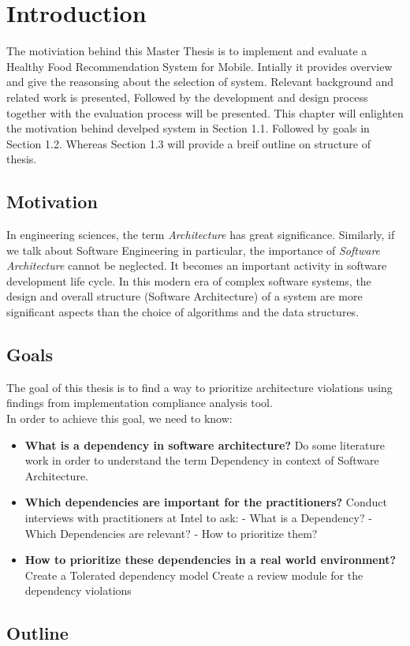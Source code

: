 \chapter{Introduction}
\setcounter{page}{1}%
\thispagestyle{empty}

The motiviation behind this Master Thesis is to implement and evaluate a Healthy Food Recommendation System for Mobile. Intially it provides overview and give the reasonsing about the selection of system. Relevant background and related work is presented, Followed by the development and design process together with the evaluation process will be presented. \newline
This chapter will enlighten the motivation behind develped system in Section 1.1. Followed by goals in Section 1.2. Whereas Section 1.3 will provide a breif outline on structure of thesis.

\section{Motivation}\label{motivation}
In engineering sciences, the term \textit{Architecture} has great significance. Similarly, if we talk about Software Engineering in particular, the importance of \textit{Software Architecture} cannot be neglected. It becomes an important activity in software development life cycle. In this modern era of complex software systems, the design and overall structure (Software Architecture) of a system are more significant aspects than the choice of algorithms and the data structures.\newline

\section{Goals}
The goal of this thesis is to find a way to prioritize architecture violations using findings from implementation compliance analysis tool. \\In order to achieve this goal, we need to know:

\begin{itemize}
	\item \textbf{What is a dependency in software architecture?}\newline
				Do some literature work in order to understand the term Dependency in context of Software Architecture.
	\item \textbf{Which dependencies are important for the practitioners?} \newline
				Conduct interviews with practitioners at Intel to ask: \newline
				- What is a Dependency? \newline
				- Which Dependencies are relevant? \newline
				- How to prioritize them?	 
	\item \textbf{How to prioritize these dependencies in a real world environment?} \newline
				Create a Tolerated dependency model
				Create a review module for the dependency violations		
\end{itemize}

\section{Outline}
